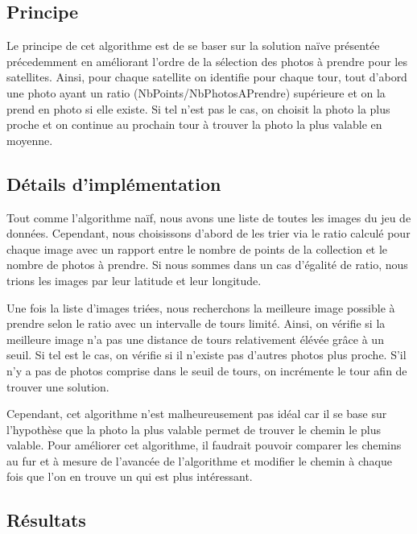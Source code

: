 \documentclass[11pt]{article}
\begin{document}
		\subsection{Principe}
		
		Le principe de cet algorithme est de se baser sur la solution naïve présentée précedemment en améliorant l'ordre de la sélection des photos à prendre pour les satellites. Ainsi, pour chaque satellite on identifie pour chaque tour, tout d'abord une photo ayant un ratio (NbPoints/NbPhotosAPrendre) supérieure et on la prend en photo si elle existe. Si tel n'est pas le cas, on choisit la photo la plus proche et on continue au prochain tour à trouver la photo la plus valable en moyenne.
		
		\subsection{Détails d'implémentation}
		
		Tout comme l'algorithme naïf, nous avons une liste de toutes les images du jeu de données. Cependant, nous choisissons d'abord de les trier via le ratio calculé pour chaque image avec un rapport entre le nombre de points de la collection et le nombre de photos à prendre. Si nous sommes dans un cas d'égalité de ratio, nous trions les images par leur latitude et leur longitude.
		
		Une fois la liste d'images triées, nous recherchons la meilleure image possible à prendre selon le ratio avec un intervalle de tours limité. Ainsi, on vérifie si la meilleure image n'a pas une distance de tours relativement élévée grâce à un seuil. Si tel est le cas, on vérifie si il n'existe pas d'autres photos plus proche. S'il n'y a pas de photos comprise dans le seuil de tours, on incrémente le tour afin de trouver une solution.
		
		Cependant, cet algorithme n'est malheureusement pas idéal car il se base sur l'hypothèse que la photo la plus valable permet de trouver le chemin le plus valable. Pour améliorer cet algorithme, il faudrait pouvoir comparer les chemins au fur et à mesure de l'avancée de l'algorithme et modifier le chemin à chaque fois que l'on en trouve un qui est plus intéressant. 
		

		\subsection{Résultats} %
		\label{sub:résultats}
\end{document}
